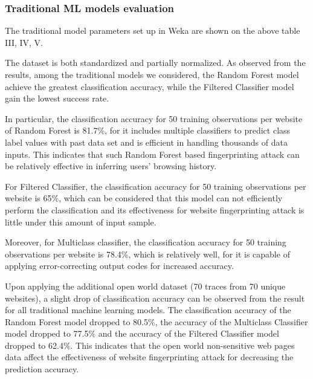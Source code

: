 \documentclass[conference]{IEEEtran}
\begin{document}
\subsubsection{Traditional ML models evaluation}
 The traditional model parameters set up in Weka are shown on the above table III, IV, V. 
 \par The dataset is both standardized and partially normalized. As observed from the results, among the traditional models we considered, the Random Forest model achieve the greatest classification accuracy, while the Filtered Classifier model gain the lowest success rate.
\par In particular, the classification accuracy for 50 training observations per website of Random Forest is 81.7\%, for it includes multiple classifiers to predict class label values with past data set and is efficient in handling thousands of data inputs. This indicates that such Random Forest based fingerprinting attack can be relatively effective in inferring users’ browsing history. 
\par For Filtered Classifier, the classification accuracy for 50 training observations per website is 65\%, which can be considered that this model can not efficiently perform the classification and its effectiveness for website fingerprinting attack is little under this amount of input sample. 
\par Moreover, for Multiclass classifier, the classification accuracy for 50 training observations per website is 78.4\%, which is relatively well, for it is capable of applying error-correcting output codes for increased accuracy. 
\par Upon applying the additional open world dataset (70 traces from 70 unique websites), a slight drop of classification accuracy can be observed from the result for all traditional machine learning models. The classification accuracy of the Random Forest model dropped to 80.5\%, the accuracy of the Multiclass Classifier model dropped to 77.5\% and the accuracy of the Filtered Classifier model dropped to 62.4\%. This indicates that the open world non-sensitive web pages data affect the effectiveness of website fingerprinting attack for decreasing the prediction accuracy. 
\end{document}

